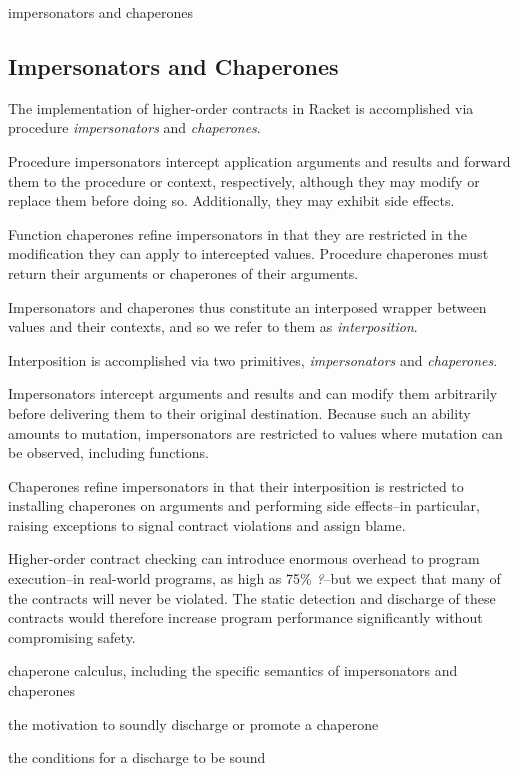 \documentclass{sigplanconf}
\begin{document}
impersonators and chaperones

\subsection{Impersonators and Chaperones}

The implementation of higher-order contracts in Racket is accomplished via procedure \emph{impersonators} and \emph{chaperones}.

Procedure impersonators intercept application arguments and results and forward them to the procedure or context, respectively, although they may modify or replace them before doing so.
Additionally, they may exhibit side effects.

Function chaperones refine impersonators in that they are restricted in the modification they can apply to intercepted values.
Procedure chaperones must return their arguments or chaperones of their arguments.

Impersonators and chaperones thus constitute an interposed wrapper between values and their contexts, and so we refer to them as \emph{interposition}.

Interposition is accomplished via two primitives, \emph{impersonators} and \emph{chaperones}.

Impersonators intercept arguments and results and can modify them arbitrarily before delivering them to their original destination.
Because such an ability amounts to mutation, impersonators are restricted to values where mutation can be observed, including functions.

Chaperones refine impersonators in that their interposition is restricted to installing chaperones on arguments and performing side effects--in particular, raising exceptions to signal contract violations and assign blame.

Higher-order contract checking can introduce enormous overhead to program execution--in real-world programs, as high as 75\% \emph{?}--but we expect that many of the contracts will never be violated.
The static detection and discharge of these contracts would therefore increase program performance significantly without compromising safety.

chaperone calculus, including the specific semantics of impersonators and chaperones

the motivation to soundly discharge or promote a chaperone

the conditions for a discharge to be sound
\end{document}
